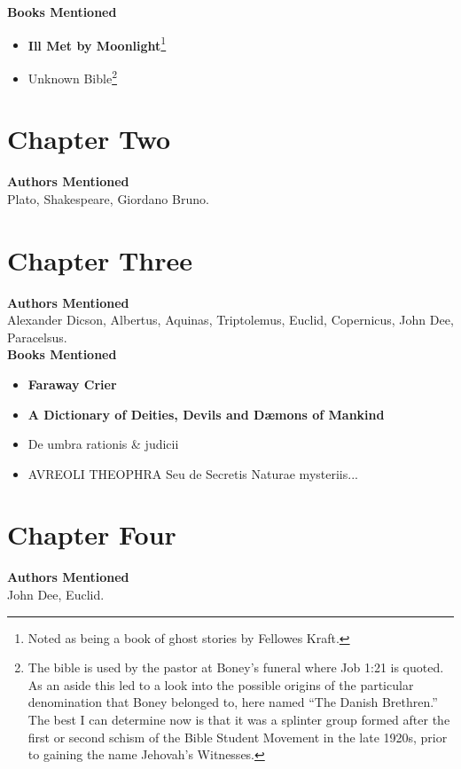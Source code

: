 \documentclass[12pt,makeidx]{extreport}
\begin{document}
\hspace{-1.5em}\textbf{Books Mentioned}
\begin{itemize}
\item \textbf{Ill Met by Moonlight}\footnote{Noted as being a book of ghost stories by Fellowes Kraft.} \parencite{KraftIll}
\item Unknown Bible\footnote{The bible is used by the pastor at Boney’s funeral where Job 1:21 is quoted. As an aside this led to a look into the possible origins of the particular denomination that Boney belonged to, here named ``The Danish Brethren.'' The best I can determine now is that it was a splinter group formed after the first or second schism of the Bible Student Movement in the late 1920s, prior to gaining the name Jehovah’s Witnesses.}
\end{itemize}

\section{Chapter Two}
\textbf{Authors Mentioned}\\
Plato, Shakespeare, Giordano Bruno.

\section{Chapter Three}
\textbf{Authors Mentioned}\\
Alexander Dicson, Albertus, Aquinas, Triptolemus, Euclid, Copernicus, John Dee, Paracelsus.
\\

\hspace{-1.5em}\textbf{Books Mentioned}
\begin{itemize}
\item \textbf{Faraway Crier} \parencite{faraway}
\item \textbf{A Dictionary of Deities, Devils and Dæmons of Mankind} \parencite{St.Phalle}
\item De umbra rationis \& judicii \parencite{Dicson1584}
\item AVREOLI THEOPHRA Seu de Secretis Naturae mysteriis... \parencite{Paracelsus1582}
\end{itemize}

\section{Chapter Four}
\textbf{Authors Mentioned}\\
John Dee, Euclid.
\\
\end{document}
